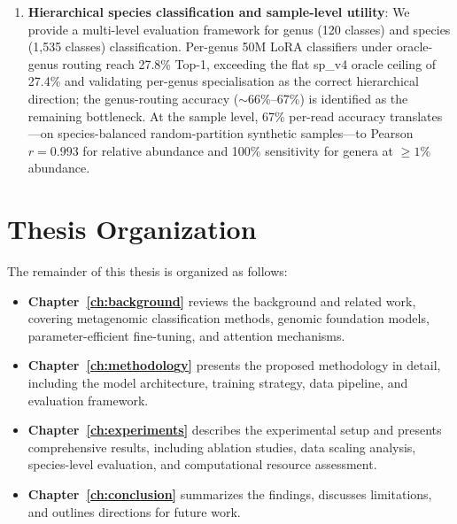 \begin{enumerate}
    \item \textbf{Hierarchical species classification and sample-level utility}: We provide a multi-level evaluation framework for genus (120 classes) and species (1,535 classes) classification. Per-genus 50M LoRA classifiers under oracle-genus routing reach 27.8\% Top-1, exceeding the flat sp\_v4 oracle ceiling of 27.4\% and validating per-genus specialisation as the correct hierarchical direction; the genus-routing accuracy ($\sim$66\%--67\%) is identified as the remaining bottleneck. At the sample level, 67\% per-read accuracy translates---on species-balanced random-partition synthetic samples---to Pearson $r = 0.993$ for relative abundance and 100\% sensitivity for genera at $\geq 1\%$ abundance.
\end{enumerate}

\section{Thesis Organization}
\label{sec:intro-organization}

The remainder of this thesis is organized as follows:

\begin{itemize}
    \item \textbf{Chapter~\ref{ch:background}} reviews the background and related work, covering metagenomic classification methods, genomic foundation models, parameter-efficient fine-tuning, and attention mechanisms.
    
    \item \textbf{Chapter~\ref{ch:methodology}} presents the proposed methodology in detail, including the model architecture, training strategy, data pipeline, and evaluation framework.
    
    \item \textbf{Chapter~\ref{ch:experiments}} describes the experimental setup and presents comprehensive results, including ablation studies, data scaling analysis, species-level evaluation, and computational resource assessment.
    
    \item \textbf{Chapter~\ref{ch:conclusion}} summarizes the findings, discusses limitations, and outlines directions for future work.
\end{itemize}
